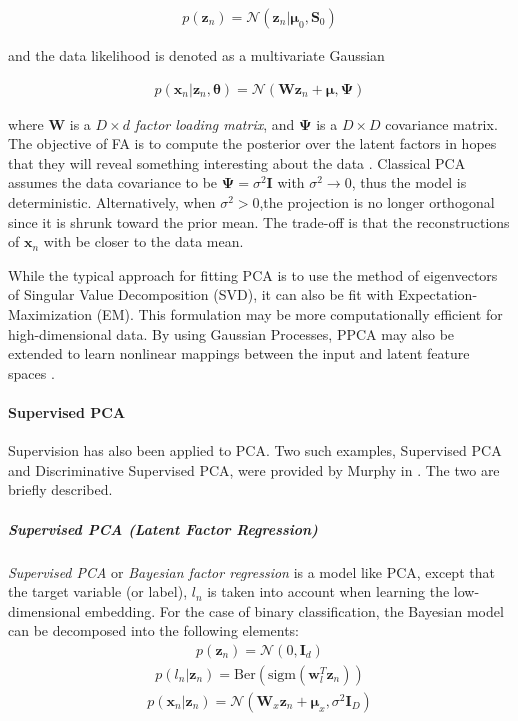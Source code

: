 \begin{align}
p(\bm{z}_n) = \mathcal{N}(\bm{z}_n|\bm{\mu}_0, \bm{S}_0)
\end{align}

\noindent
and the data likelihood is denoted as a multivariate Gaussian

\begin{align}
p(\bm{x}_n|\bm{z}_n,\bm{\theta}) = \mathcal{N}(\bm{W}\bm{z}_n + \bm{\mu}, \bm{\Psi})
\end{align}

\noindent
where $\bm{W}$ is a $D \times d$ \textit{factor loading matrix}, and $\bm{\Psi}$ is a $D \times D$ covariance matrix.  The objective of FA is to compute the posterior over the latent factors in hopes that they will reveal something interesting about the data \citep{Murphy2012}.  Classical PCA assumes the data covariance to be $\bm{\Psi} = \sigma^2\bm{I}$ with $\sigma^2 \rightarrow 0$, thus the model is deterministic.  Alternatively, when $\sigma^2 > 0$,the projection is no longer orthogonal since it is shrunk toward the prior mean.  The trade-off is that the reconstructions of $\bm{x}_n$ with be closer to the data mean.


While the typical approach for fitting PCA is to use the method of eigenvectors of Singular Value Decomposition (SVD), it can also be fit with Expectation-Maximization (EM).  This formulation may be more computationally efficient for high-dimensional data.  By using Gaussian Processes, PPCA may also be extended to learn nonlinear mappings between the input and latent feature spaces \citep{VanDerMaaten2009DRReview}.

\paragraph{Supervised PCA}

Supervision has also been applied to PCA.  Two such examples, Supervised PCA and Discriminative Supervised PCA, were provided by Murphy in \citep{Murphy2012}.  The two are briefly described. 

\subparagraph{Supervised PCA (Latent Factor Regression)}
\textit{Supervised PCA} or \textit{Bayesian factor regression} is a model like PCA, except that the target variable (or label), $l_n$ is taken into account when learning the low-dimensional embedding.  For the case of binary classification, the Bayesian model can be decomposed into the following elements:
\begin{align}
	p(\bm{z}_n) = \mathcal{N}(0,\bm{I}_d)
\end{align}
\begin{align}
	p(l_n|\bm{z}_n) = \text{Ber}(\text{sigm}(\bm{w}^{T}_{l}\bm{z}_n))
\end{align}
\begin{align}
	p(\bm{x}_n|\bm{z}_n) = \mathcal{N}(\bm{W}_{x}\bm{z}_{n} + \bm{\mu}_{x}, \sigma^{2}\bm{I}_D)
\end{align}

